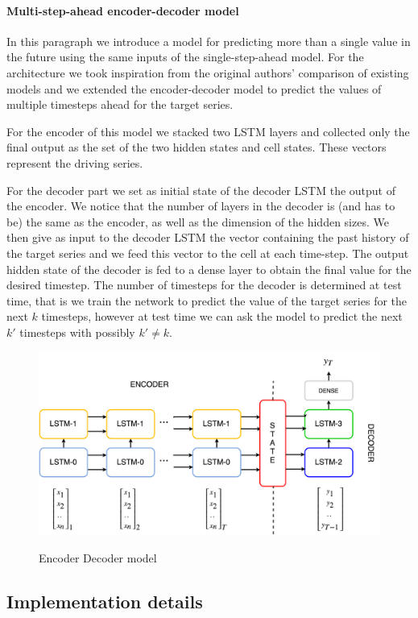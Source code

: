 \documentclass{article}
\begin{document}
\paragraph{Multi-step-ahead encoder-decoder model}

In this paragraph we introduce a model for predicting more than a single value in 
the future using the same inputs of the single-step-ahead model. 
For the architecture we took inspiration from the original authors' comparison of
existing models and we extended the encoder-decoder model to predict the values
of multiple timesteps ahead for the target series.

For the encoder of this model we stacked two LSTM layers and collected only the 
final output as the set of the two hidden states and cell states. These vectors
represent the driving series.

For the decoder part we set as initial state of the decoder LSTM the output of the
encoder. We notice that the number of layers in the decoder is (and has to be) the
same as the encoder, as well as the dimension of the hidden sizes. We then give as
input to the decoder LSTM the vector containing the past history of the target 
series and we feed this vector to the cell at each time-step. The output hidden
state of the decoder is fed to a dense layer to obtain the final value for the 
desired timestep. The number of timesteps for the decoder is determined at test
time, that is we train the network to predict the value of the target series for
the next $k$ timesteps, however at test time we can ask the model to predict the 
next $k'$ timesteps with possibly $k' \ne k$.

\begin{figure}[ht]
\centering
\includegraphics[width=0.7\linewidth]{img/ende-rnn.png} \\
\caption{Encoder Decoder model}
\label{fig:ende-rnn}
\end{figure}


\subsection{Implementation details}
\end{document}
